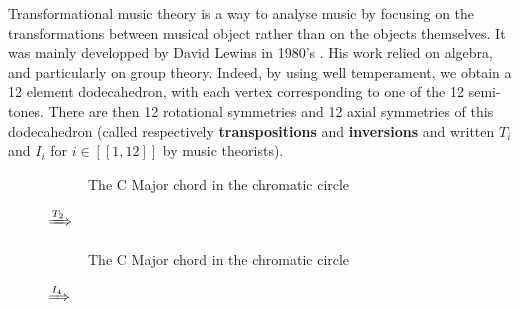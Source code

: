 Transformational music theory is a way to analyse music by focusing on the transformations between musical object rather than on the objects themselves. It was mainly developped by David Lewins in 1980's \cite{rahn_lewin_1987}. His work relied on algebra, and particularly on group theory. Indeed, by using well temperament, we obtain a 12 element dodecahedron, with each vertex corresponding to one of the 12 semi-tones. There are then 12 rotational symmetries and 12 axial symmetries of this dodecahedron (called  respectively \textbf{transpositions} and \textbf{inversions} and written $T_i$ and $I_i$ for $i\in [\![1,12]\!]$ by music theorists).



\begin{figure}
    \begin{subfigure}{.3\textwidth}
        \centering
        \setcounter{itemcount}{450}
        \renewcommand*{\do}[1]{
            \filldraw [black](\number\value{itemcount}:3cm)
            circle (1.5pt)
            node[anchor={\number\value{itemcount}-180}]
                {#1\addtocounter{itemcount}{-30}};}
        \caption{The C Major chord in the chromatic circle}
        \label{Cmajor}
    \end{subfigure}%
    {\LARGE$\xRightarrow{T_2}$}%
    \begin{subfigure}{.3\textwidth}
        \centering
        \setcounter{itemcount}{510}
        \renewcommand*{\do}[1]{
            \filldraw [black](\number\value{itemcount}:3cm)
            circle (1.5pt)
            node[anchor={\number\value{itemcount}-180}]
                {#1\addtocounter{itemcount}{-30}};}
        \caption{The C Major chord in the chromatic circle}
        \label{Cmajor}
    \end{subfigure}%
    {\LARGE$\xRightarrow{I_4}$}%
    \begin{subfigure}{.3\textwidth}
        \centering
        \setcounter{itemcount}{510}
        \renewcommand*{\do}[1]{
        \filldraw [black](\number\value{itemcount}:3cm)
        circle (1.5pt)
        node[anchor={\number\value{itemcount}-180}]
            {#1\addtocounter{itemcount}{30}};}
        \begin{tikzpicture}[scale=0.55]


\end{tikzpicture}
\end{subfigure}
\end{figure}
